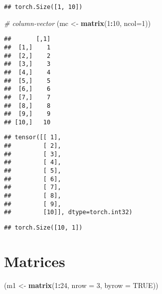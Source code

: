 \documentclass[]{book}
\newenvironment{Shaded}{\begin{snugshade}}{\end{snugshade}}
\newcommand{\CommentTok}[1]{\textcolor[rgb]{0.56,0.35,0.01}{\textit{#1}}}
\newcommand{\DataTypeTok}[1]{\textcolor[rgb]{0.13,0.29,0.53}{#1}}
\newcommand{\DecValTok}[1]{\textcolor[rgb]{0.00,0.00,0.81}{#1}}
\newcommand{\KeywordTok}[1]{\textcolor[rgb]{0.13,0.29,0.53}{\textbf{#1}}}
\newcommand{\NormalTok}[1]{#1}
\newcommand{\OperatorTok}[1]{\textcolor[rgb]{0.81,0.36,0.00}{\textbf{#1}}}
\newcommand{\OtherTok}[1]{\textcolor[rgb]{0.56,0.35,0.01}{#1}}
\newcommand{\StringTok}[1]{\textcolor[rgb]{0.31,0.60,0.02}{#1}}
\begin{document}
\begin{verbatim}
## torch.Size([1, 10])
\end{verbatim}

\begin{Shaded}
\begin{Highlighting}[]
\CommentTok{# column-vector}
\NormalTok{(mc <-}\StringTok{ }\KeywordTok{matrix}\NormalTok{(}\DecValTok{1}\OperatorTok{:}\DecValTok{10}\NormalTok{, }\DataTypeTok{ncol=}\DecValTok{1}\NormalTok{))}
\end{Highlighting}
\end{Shaded}

\begin{verbatim}
##       [,1]
##  [1,]    1
##  [2,]    2
##  [3,]    3
##  [4,]    4
##  [5,]    5
##  [6,]    6
##  [7,]    7
##  [8,]    8
##  [9,]    9
## [10,]   10
\end{verbatim}

\begin{Shaded}
\end{Shaded}

\begin{verbatim}
## tensor([[ 1],
##         [ 2],
##         [ 3],
##         [ 4],
##         [ 5],
##         [ 6],
##         [ 7],
##         [ 8],
##         [ 9],
##         [10]], dtype=torch.int32)
\end{verbatim}

\begin{Shaded}
\end{Shaded}

\begin{verbatim}
## torch.Size([10, 1])
\end{verbatim}

\hypertarget{matrices}{%
\section{Matrices}\label{matrices}}

\begin{Shaded}
\begin{Highlighting}[]
\NormalTok{(m1 <-}\StringTok{ }\KeywordTok{matrix}\NormalTok{(}\DecValTok{1}\OperatorTok{:}\DecValTok{24}\NormalTok{, }\DataTypeTok{nrow =} \DecValTok{3}\NormalTok{, }\DataTypeTok{byrow =} \OtherTok{TRUE}\NormalTok{))}
\end{Highlighting}
\end{Shaded}
\end{document}
